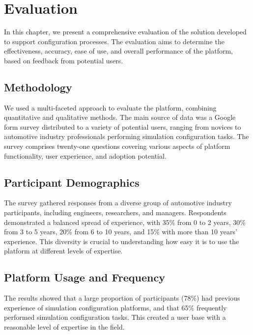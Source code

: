 \section{Evaluation\label{sec:evaluation}}
In this chapter, we present a comprehensive evaluation of the solution developed to support configuration processes. The evaluation aims to determine the effectiveness, accuracy, ease of use, and overall performance of the platform, based on feedback from potential users.\\



\subsection{Methodology}
We used a multi-faceted approach to evaluate the platform, combining quantitative and qualitative methods. The main source of data was a Google form survey distributed to a variety of potential users, ranging from novices to automotive industry professionals performing simulation configuration tasks. The survey comprises twenty-one questions covering various aspects of platform functionality, user experience, and adoption potential.\\


\subsection{Participant Demographics}
The survey gathered responses from a diverse group of automotive industry participants, including engineers, researchers, and managers. Respondents demonstrated a balanced spread of experience, with 35\% from 0 to 2 years, 30\% from 3 to 5 years, 20\% from 6 to 10 years, and 15\% with more than 10 years' experience. This diversity is crucial to understanding how easy it is to use the platform at different levels of expertise.\\


\subsection{Platform Usage and Frequency}
The results showed that a large proportion of participants (78\%) had previous experience of simulation configuration platforms, and that 65\% frequently performed simulation configuration tasks. This created a user base with a reasonable level of expertise in the field.\\


